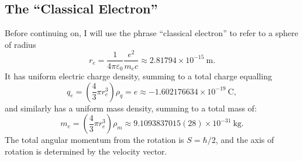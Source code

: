 \subsection{The ``Classical Electron''}
Before continuing on, I will use the phrase ``classical electron'' to
refer to a sphere of radius
\begin{equation}
r_{e} = \frac{1}{4\pi\varepsilon_{0}}\frac{e^{2}}{m_{e}c}\approx2.81794\times10^{-15}~\mathrm{m}.
\end{equation}
It has uniform electric charge density, summing to a total charge equalling
\begin{equation}
q_{e} = \left(\frac{4}{3}\pi r_{e}^{3}\right)\rho_{q} = e\approx-1.602176634\times10^{-19}~\mathrm{C},
\end{equation}
and similarly has a uniform mass density, summing to a total mass of:
\begin{equation}
m_{e} = \left(\frac{4}{3}\pi r_{e}^{3}\right)\rho_{m} \approx 9.1093837015(28)\times10^{-31}~\mathrm{kg}.
\end{equation}
The total angular momentum from the rotation is $S=\hbar/2$, and the
axis of rotation is determined by the velocity vector.


